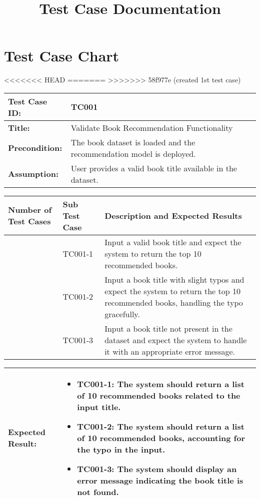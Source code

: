 \documentclass{article}
\title{Test Case Documentation}
\date{}
\begin{document}
\maketitle

\section*{Test Case Chart}

<<<<<<< HEAD
=======
>>>>>>> 58f977e (created 1st test case)
\noindent
\begin{tabularx}{\textwidth}{|>{\raggedright\arraybackslash}p{4cm}|X|}
    \hline
    \textbf{Test Case ID:} & TC001 \\ \hline
    \textbf{Title:} & Validate Book Recommendation Functionality \\ \hline
    \textbf{Precondition:} & The book dataset is loaded and the recommendation model is deployed. \\ \hline
    \textbf{Assumption:} & User provides a valid book title available in the dataset. \\ \hline
\end{tabularx}

\noindent
\begin{tabularx}{\textwidth}{|>{\centering\arraybackslash}p{3cm}|>{\centering\arraybackslash}p{3cm}|X|}
    \hline
    \textbf{Number of Test Cases} & \textbf{Sub Test Case} & \textbf{Description and Expected Results} \\ \hline
    1 & TC001-1 & Input a valid book title and expect the system to return the top 10 recommended books. \\ \hline
    2 & TC001-2 & Input a book title with slight typos and expect the system to return the top 10 recommended books, handling the typo gracefully. \\ \hline
    3 & TC001-3 & Input a book title not present in the dataset and expect the system to handle it with an appropriate error message. \\ \hline
\end{tabularx}

\noindent
\begin{tabularx}{\textwidth}{|>{\raggedright\arraybackslash}p{4cm}|X|}
    \hline
    \textbf{Expected Result:} & 
    \begin{itemize}
        \item TC001-1: The system should return a list of 10 recommended books related to the input title.
        \item TC001-2: The system should return a list of 10 recommended books, accounting for the typo in the input.
        \item TC001-3: The system should display an error message indicating the book title is not found.
    \end{itemize}
    \\ \hline
\end{tabularx}
\end{document}
